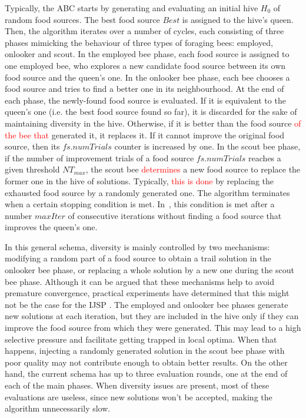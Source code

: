 \documentclass[sn-mathphys]{sn-jnl}%
\theoremstyle{thmstyleone}%
\theoremstyle{thmstyletwo}%
\theoremstyle{thmstylethree}%
\newcommand{\review}[1]{\textcolor{red}{#1}} %
\begin{document}
Typically, the ABC starts by generating and evaluating an initial hive $H_0$ of random food sources. The best food source $Best$ is assigned to the hive's queen. Then, the algorithm iterates over a number of cycles, each consisting of three phases mimicking the behaviour of three types of foraging bees: employed, onlooker and scout. In the employed bee phase, each food source is assigned to one employed bee, who explores a new candidate food source between its own food source and the queen’s one. In the onlooker bee phase, each bee chooses a food source and tries to find a better one in its neighbourhood. At the end of each phase, the newly-found food source is evaluated. If it is equivalent to the queen’s one (i.e. the best food source found so far), it is discarded for the sake of maintaining diversity in the hive. Otherwise, if it is better than the food source \review{of the bee that} generated it, it replaces it. If it cannot improve the original food source, then its $fs.numTrials$ counter is increased by one. In the scout bee phase, if the number of improvement trials of a food source $fs.numTrials$ reaches a given threshold $NT_{max}$, the scout bee \review{determines} a new food source to replace the former one in the hive of solutions. Typically, \review{this is done} by replacing the exhausted food source by a randomly generated one. The algorithm terminates when a certain stopping condition is met. In~\cite{Diaz2022}, this condition is met after a number $maxIter$ of consecutive iterations without finding a food source that improves the queen’s one.

In this general schema, diversity is mainly controlled by two mechanisms: modifying a random part of a food source to obtain a trail solution in the onlooker bee phase, or replacing a whole solution by a new one during the scout bee phase. Although it can be argued that these mechanisms help to avoid premature convergence, practical experiments have determined that this might not be the case for the IJSP \cite{Diaz2022}. The employed and onlooker bee phases generate new solutions at each iteration, but they are included in the hive only if they can improve the food source from which they were generated. This may lead to a high selective pressure and facilitate getting trapped in local optima. When that happens, injecting a randomly generated solution in the scout bee phase with poor quality may not contribute enough to obtain better results. On the other hand, the current schema has up to three evaluation rounds, one at the end of each of the main phases. When diversity issues are present, most of these evaluations are useless, since new solutions won't be accepted, making the algorithm unnecessarily slow.
\end{document}

